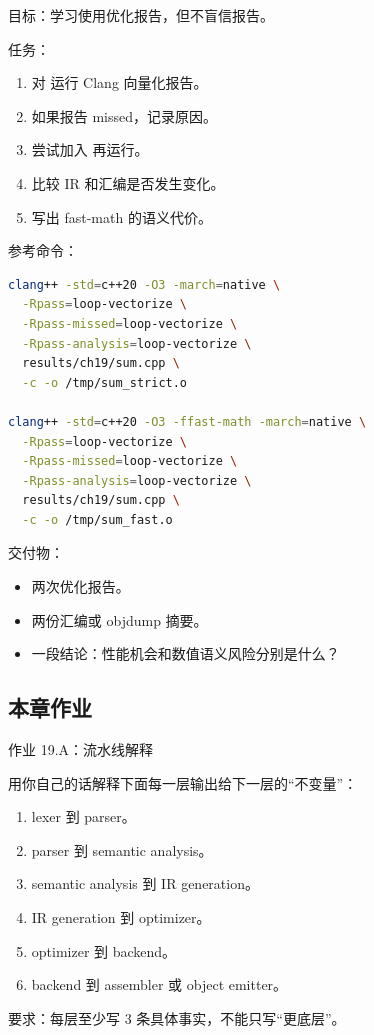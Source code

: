 \begin{labbox}
目标：学习使用优化报告，但不盲信报告。

任务：

\begin{enumerate}
  \item 对  运行 Clang 向量化报告。
  \item 如果报告 missed，记录原因。
  \item 尝试加入  再运行。
  \item 比较 IR 和汇编是否发生变化。
  \item 写出 fast-math 的语义代价。
\end{enumerate}

参考命令：

\begin{lstlisting}[language=bash]
clang++ -std=c++20 -O3 -march=native \
  -Rpass=loop-vectorize \
  -Rpass-missed=loop-vectorize \
  -Rpass-analysis=loop-vectorize \
  results/ch19/sum.cpp \
  -c -o /tmp/sum_strict.o

clang++ -std=c++20 -O3 -ffast-math -march=native \
  -Rpass=loop-vectorize \
  -Rpass-missed=loop-vectorize \
  -Rpass-analysis=loop-vectorize \
  results/ch19/sum.cpp \
  -c -o /tmp/sum_fast.o
\end{lstlisting}

交付物：

\begin{itemize}
  \item 两次优化报告。
  \item 两份汇编或 objdump 摘要。
  \item 一段结论：性能机会和数值语义风险分别是什么？
\end{itemize}
\end{labbox}

\subsection{本章作业}

\begin{exercisebox}
作业 19.A：流水线解释

用你自己的话解释下面每一层输出给下一层的“不变量”：

\begin{enumerate}
  \item lexer 到 parser。
  \item parser 到 semantic analysis。
  \item semantic analysis 到 IR generation。
  \item IR generation 到 optimizer。
  \item optimizer 到 backend。
  \item backend 到 assembler 或 object emitter。
\end{enumerate}

要求：每层至少写 3 条具体事实，不能只写“更底层”。
\end{exercisebox}

